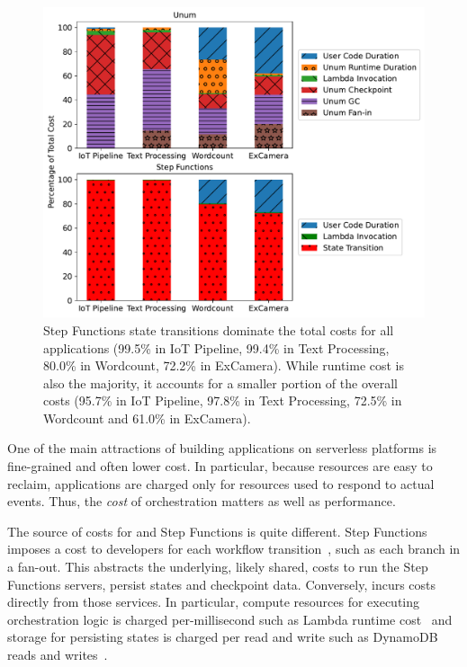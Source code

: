 \begin{figure}[t!]
    \centering
    \includegraphics[width=\columnwidth]{figures/AppCostBreakdown.pdf}
    \caption{Step Functions state transitions dominate the total costs for all
    applications (99.5\% in IoT Pipeline, 99.4\% in Text Processing, 80.0\% in
    Wordcount, 72.2\% in ExCamera). While \name{} runtime cost is also the
    majority, it accounts for a smaller portion of the overall costs (95.7\%
    in IoT Pipeline, 97.8\% in Text Processing, 72.5\%
    in Wordcount and 61.0\% in ExCamera).}
    \label{fig:cost-breakdown}
\end{figure}

One of the main attractions of building applications on serverless platforms
is fine-grained and often lower cost. In particular, because resources are
easy to reclaim, applications are charged only for resources used to respond
to actual events. Thus, the \emph{cost} of orchestration matters as well as
performance.

The source of costs for \name{} and Step Functions is quite different. Step
Functions imposes a cost to developers for each workflow
transition~\cite{aws-step-functions-pricing}, such as each branch in a
fan-out. This abstracts the underlying, likely shared, costs to run the Step
Functions servers, persist states and checkpoint data. Conversely, \name{}
incurs costs directly from those services. In particular, compute resources
for executing orchestration logic is charged per-millisecond such as Lambda
runtime cost~\cite{aws-lambda-pricing} and storage for persisting states is
charged per read and write such as DynamoDB reads and
writes~\cite{dynamodb-pricing}.

